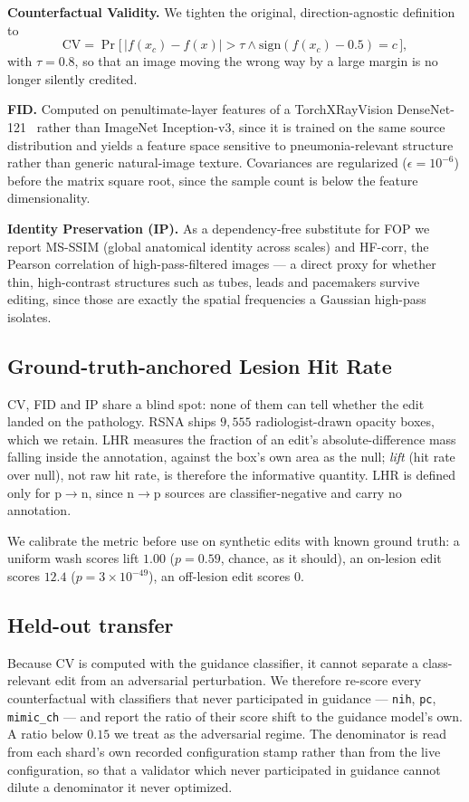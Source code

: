 \documentclass[10pt,twocolumn,letterpaper]{article}
\begin{document}
\textbf{Counterfactual Validity.} We tighten the original,
direction-agnostic definition to
\begin{equation}
\mathrm{CV} = \Pr\big[\,|f(x_c)-f(x)|>\tau \wedge \mathrm{sign}(f(x_c)-0.5)=c\,\big],
\label{eq:cv}
\end{equation}
with $\tau=0.8$, so that an image moving the wrong way by a large margin
is no longer silently credited.

\textbf{FID.} Computed on penultimate-layer features of a
TorchXRayVision DenseNet-121~\cite{cohen2020xrv} rather than ImageNet
Inception-v3, since it is trained on the same source distribution and
yields a feature space sensitive to pneumonia-relevant structure rather
than generic natural-image texture. Covariances are regularized
($\epsilon=10^{-6}$) before the matrix square root, since the sample
count is below the feature dimensionality.

\textbf{Identity Preservation (IP).} As a dependency-free substitute for
FOP we report MS-SSIM (global anatomical identity across scales) and
HF-corr, the Pearson correlation of high-pass-filtered images --- a
direct proxy for whether thin, high-contrast structures such as tubes,
leads and pacemakers survive editing, since those are exactly the
spatial frequencies a Gaussian high-pass isolates.

\subsection{Ground-truth-anchored Lesion Hit Rate}
CV, FID and IP share a blind spot: none of them can tell whether the
edit landed on the pathology. RSNA ships $9{,}555$ radiologist-drawn
opacity boxes, which we retain. LHR measures the fraction of an edit's
absolute-difference mass falling inside the annotation, against the
box's own area as the null; \emph{lift} (hit rate over null), not raw hit
rate, is therefore the informative quantity. LHR is defined only for
p$\to$n, since n$\to$p sources are classifier-negative and carry no
annotation.

We calibrate the metric before use on synthetic edits with known ground
truth: a uniform wash scores lift $1.00$ ($p=0.59$, chance, as it
should), an on-lesion edit scores $12.4$ ($p=3\times10^{-49}$), an
off-lesion edit scores $0$.

\subsection{Held-out transfer}
Because CV is computed with the guidance classifier, it cannot separate
a class-relevant edit from an adversarial perturbation. We therefore
re-score every counterfactual with classifiers that never participated
in guidance --- \texttt{nih}, \texttt{pc}, \texttt{mimic\_ch} --- and
report the ratio of their score shift to the guidance model's own. A
ratio below $0.15$ we treat as the adversarial regime. The denominator
is read from each shard's own recorded configuration stamp rather than
from the live configuration, so that a validator which never
participated in guidance cannot dilute a denominator it never optimized.
\end{document}

